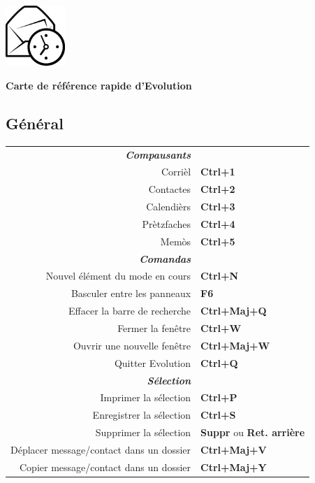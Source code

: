 \documentclass[12pt]{article}
\date {}
\begin{document}
	\begin{landscape}


	\begin{center}
	\begin{minipage}[m]
		{1in}\includegraphics[height=0.9in]{../evolution-logo.eps}\hspace{5mm}
	\end{minipage}
	\hspace{5mm}
	\textbf{\Huge{Carte de référence rapide d'Evolution}}
	\end{center}

	\begin{center}
	\begin{multicols}{2}
	\section*{Général}
	\begin{tabular*}{4in}{rp{1.5in}}
		\textit{\textbf{Compausants}}		&					\\
		Corrièl					& \textbf{Ctrl+1}			\\
		Contactes				& \textbf{Ctrl+2}			\\
		Calendièrs				& \textbf{Ctrl+3}			\\
		Prètzfaches					& \textbf{Ctrl+4}			\\
		\vspace{1.5mm}
		Memòs					& \textbf{Ctrl+5}			\\
		\textit{\textbf{Comandas}}		&					\\
		Nouvel élément du mode en cours		& \textbf{Ctrl+N}			\\
		Basculer entre les panneaux		& \textbf{F6}				\\
		Effacer la barre de recherche			& \textbf{Ctrl+Maj+Q}			\\
		Fermer la fenêtre				& \textbf{Ctrl+W}			\\
		Ouvrir une nouvelle fenêtre				& \textbf{Ctrl+Maj+W}			\\
		\vspace{1.5mm}
		Quitter Evolution				& \textbf{Ctrl+Q}			\\
		\textit{\textbf{Sélection}}		&					\\
		Imprimer la sélection				& \textbf{Ctrl+P}			\\
		Enregistrer la sélection				& \textbf{Ctrl+S}			\\
		Supprimer la sélection			& \textbf{Suppr} ou \textbf{Ret. arrière}	\\
		Déplacer message/contact dans un dossier		& \textbf{Ctrl+Maj+V}			\\
		Copier message/contact dans un dossier		& \textbf{Ctrl+Maj+Y}			\\
	\end{tabular*}

\end{multicols}
\end{center}
\end{landscape}
\end{document}
